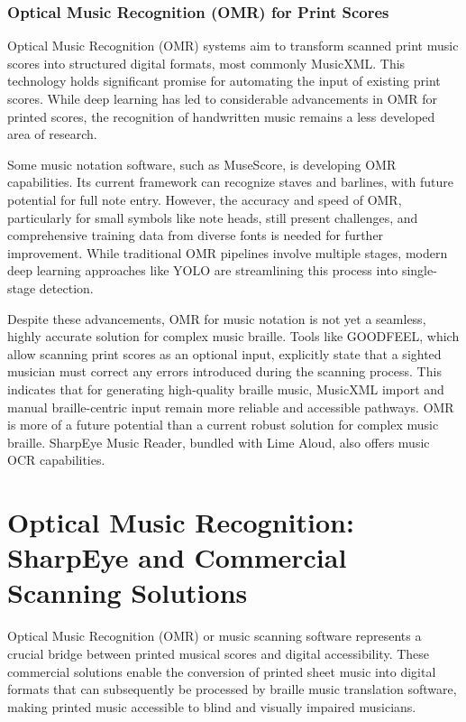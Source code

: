 \subsubsection{Optical Music Recognition (OMR) for Print Scores}
Optical Music Recognition (OMR) systems aim to transform scanned print music scores into structured digital formats, most commonly MusicXML. \cite{researchgate-musescore-symbols} This technology holds significant promise for automating the input of existing print scores. While deep learning has led to considerable advancements in OMR for printed scores, the recognition of handwritten music remains a less developed area of research. \cite{researchgate-musescore-symbols}

Some music notation software, such as MuseScore, is developing OMR capabilities. Its current framework can recognize staves and barlines, with future potential for full note entry. \cite{musescore-omr} However, the accuracy and speed of OMR, particularly for small symbols like note heads, still present challenges, and comprehensive training data from diverse fonts is needed for further improvement. \cite{musescore-omr} While traditional OMR pipelines involve multiple stages, modern deep learning approaches like YOLO are streamlining this process into single-stage detection. \cite{researchgate-musescore-symbols}

Despite these advancements, OMR for music notation is not yet a seamless, highly accurate solution for complex music braille. Tools like GOODFEEL, which allow scanning print scores as an optional input, explicitly state that a sighted musician must correct any errors introduced during the scanning process. \cite{dancingdots-goodfeel} This indicates that for generating high-quality braille music, MusicXML import and manual braille-centric input remain more reliable and accessible pathways. OMR is more of a future potential than a current robust solution for complex music braille. SharpEye Music Reader, bundled with Lime Aloud, also offers music OCR capabilities. \cite{canasstech-limealoud}

\section{Optical Music Recognition: SharpEye and Commercial Scanning Solutions}

Optical Music Recognition (OMR) or music scanning software represents a crucial bridge between printed musical scores and digital accessibility. These commercial solutions enable the conversion of printed sheet music into digital formats that can subsequently be processed by braille music translation software, making printed music accessible to blind and visually impaired musicians.

